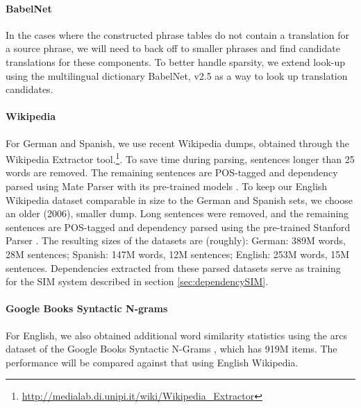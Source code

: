 \documentclass[11pt]{article}
\begin{document}
\paragraph{BabelNet} %

In the cases where the constructed phrase tables do not contain a translation
for a source phrase, we will need to back off to smaller phrases and find
candidate translations for these components.  To better handle sparsity, we
extend look-up using the multilingual dictionary BabelNet, v2.5
\cite{Navigli:Ponzetto:12} as a way to look up translation candidates.

\paragraph{Wikipedia} %


For German and Spanish, we use recent Wikipedia dumps, obtained through the Wikipedia Extractor tool.\footnote{\url{http://medialab.di.unipi.it/wiki/Wikipedia_Extractor}}. To save time during parsing, sentences longer than 25 words are removed. The remaining sentences are POS-tagged and dependency parsed using Mate Parser with its pre-trained models \cite{bohnet:10,bohnet:kuhn:12,seeker:kuhn:13}. To keep our English Wikipedia dataset comparable in size to the German and Spanish sets, we choose an older (2006), smaller dump. Long sentences were removed, and the remaining sentences are POS-tagged and dependency parsed using the pre-trained Stanford Parser \cite{klein:manning:03,marneffe:maccartney:ea:06}. The resulting sizes of the datasets are (roughly): German: 389M words, 28M sentences; Spanish: 147M words, 12M sentences; English: 253M words, 15M sentences. Dependencies extracted from these parsed datasets serve as training for the SIM system described in section \ref{sec:dependencySIM}.

\paragraph{Google Books Syntactic N-grams}

For English, we also obtained additional word similarity statistics using the arcs dataset of the Google Books Syntactic N-Grams \cite{goldberg:orwant:13}, which has 919M items. The performance will be compared against that using English Wikipedia. 
 
\end{document}
